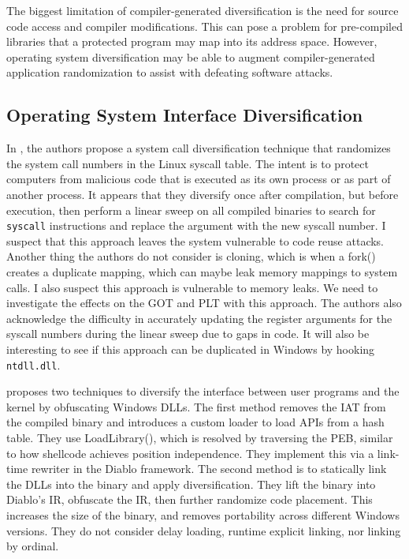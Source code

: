 \documentclass[preprint,12pt]{elsarticle}
\begin{document}
The biggest limitation of compiler-generated diversification is the need for source code access and compiler modifications. This can pose a problem for pre-compiled libraries that a protected program may map into its address space. However, operating system diversification may be able to augment compiler-generated application randomization to assist with defeating software attacks. 

\subsection{Operating System Interface Diversification}

In \cite{Rauti14}, the authors propose a system call diversification technique that randomizes the system call numbers in the Linux syscall table. The intent is to protect computers from malicious code that is executed as its own process or as part of another process. It appears that they diversify once after compilation, but before execution, then perform a linear sweep on all compiled binaries to search for \texttt{syscall} instructions and replace the argument with the new syscall number. I suspect that this approach leaves the system vulnerable to code reuse attacks. Another thing the authors do not consider is cloning, which is when a fork() creates a duplicate mapping, which can maybe leak memory mappings to system calls. I also suspect this approach is vulnerable to memory leaks. We need to investigate the effects on the GOT and PLT with this approach. The authors also acknowledge the difficulty in accurately updating the register arguments for the syscall numbers during the linear sweep due to gaps in code. It will also be interesting to see if this approach can be duplicated in Windows by hooking \texttt{ntdll.dll}.

\cite{abrath2015obfuscating} proposes two techniques to diversify the interface between user programs and the kernel by obfuscating Windows DLLs. The first method removes the IAT from the compiled binary and introduces a custom loader to load APIs from a hash table. They use LoadLibrary(), which is resolved by traversing the PEB, similar to how shellcode achieves position independence. They implement this via a link-time rewriter in the Diablo framework. The second method is to statically link the DLLs into the binary and apply diversification. They lift the binary into Diablo's IR, obfuscate the IR, then further randomize code placement. This increases the size of the binary, and removes portability across different Windows versions. They do not consider delay loading, runtime explicit linking, nor linking by ordinal.
\end{document}

